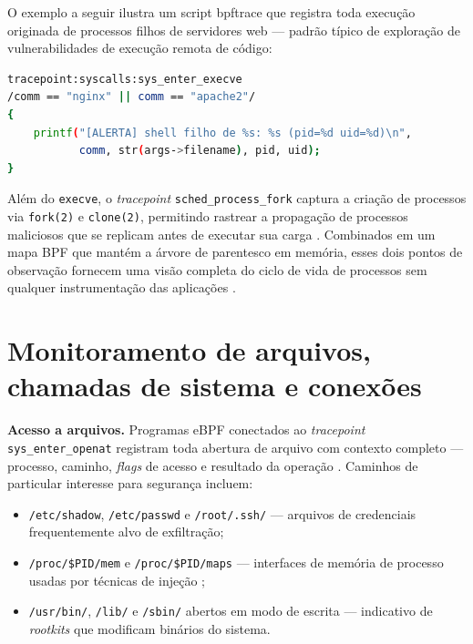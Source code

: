 O exemplo a seguir ilustra um script bpftrace que registra toda execução
originada de processos filhos de servidores web — padrão típico de exploração de
vulnerabilidades de execução remota de código:

\begin{lstlisting}[language=bash, caption={Detecção de shell a partir de processo de serviço web com bpftrace.}]
tracepoint:syscalls:sys_enter_execve
/comm == "nginx" || comm == "apache2"/
{
    printf("[ALERTA] shell filho de %s: %s (pid=%d uid=%d)\n",
           comm, str(args->filename), pid, uid);
}
\end{lstlisting}

Além do \texttt{execve}, o \textit{tracepoint} \texttt{sched\_process\_fork}
captura a criação de processos via \texttt{fork(2)} e \texttt{clone(2)},
permitindo rastrear a propagação de processos maliciosos que se replicam antes de
executar sua carga \cite{gregg2020}.
Combinados em um mapa BPF que mantém a árvore de parentesco em memória, esses
dois pontos de observação fornecem uma visão completa do ciclo de vida de processos
sem qualquer instrumentação das aplicações \cite{majors2022}.

\section{Monitoramento de arquivos, chamadas de sistema e conexões}

\textbf{Acesso a arquivos.}
Programas eBPF conectados ao \textit{tracepoint} \texttt{sys\_enter\_openat}
registram toda abertura de arquivo com contexto completo — processo, caminho,
\textit{flags} de acesso e resultado da operação \cite{linuxkernel2024}.
Caminhos de particular interesse para segurança incluem:

\begin{itemize}
  \item \texttt{/etc/shadow}, \texttt{/etc/passwd} e \texttt{/root/.ssh/} —
        arquivos de credenciais frequentemente alvo de exfiltração;
  \item \texttt{/proc/\$PID/mem} e \texttt{/proc/\$PID/maps} — interfaces de
        memória de processo usadas por técnicas de injeção \cite{manpages2024};
  \item \texttt{/usr/bin/}, \texttt{/lib/} e \texttt{/sbin/} abertos em modo de
        escrita — indicativo de \textit{rootkits} que modificam binários do sistema.
\end{itemize}

